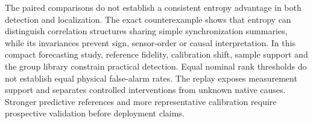 The paired comparisons do not establish a consistent entropy advantage in both detection and localization. The exact counterexample shows that entropy can distinguish correlation structures sharing simple synchronization summaries, while its invariances prevent sign, sensor-order or causal interpretation. In this compact forecasting study, reference fidelity, calibration shift, sample support and the group library constrain practical detection. Equal nominal rank thresholds do not establish equal physical false-alarm rates. The replay exposes measurement support and separates controlled interventions from unknown native causes. Stronger predictive references and more representative calibration require prospective validation before deployment claims.

